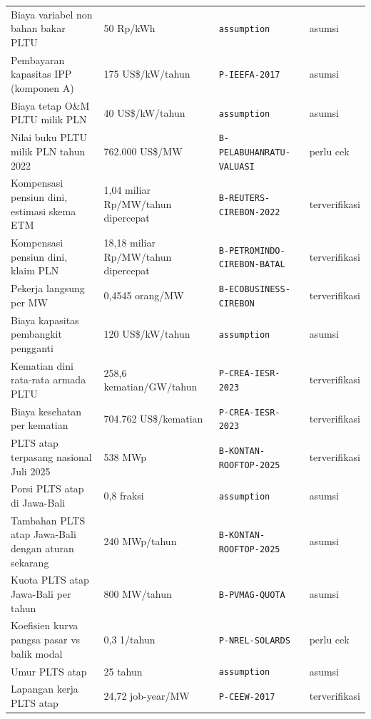 \begin{longtable}{p{} p{} p{} p{}}
Biaya variabel non bahan bakar PLTU & 50 Rp/kWh & \texttt{assumption} & asumsi \\
Pembayaran kapasitas IPP (komponen A) & 175 US\$/kW/tahun & \texttt{P-\allowbreak{}IEEFA-\allowbreak{}2017} & asumsi \\
Biaya tetap O\&M PLTU milik PLN & 40 US\$/kW/tahun & \texttt{assumption} & asumsi \\
Nilai buku PLTU milik PLN tahun 2022 & 762.000 US\$/MW & \texttt{B-\allowbreak{}PELABUHANRATU-\allowbreak{}VALUASI} & perlu cek \\
Kompensasi pensiun dini, estimasi skema ETM & 1,04 miliar Rp/MW/tahun dipercepat & \texttt{B-\allowbreak{}REUTERS-\allowbreak{}CIREBON-\allowbreak{}2022} & terverifikasi \\
Kompensasi pensiun dini, klaim PLN & 18,18 miliar Rp/MW/tahun dipercepat & \texttt{B-\allowbreak{}PETROMINDO-\allowbreak{}CIREBON-\allowbreak{}BATAL} & terverifikasi \\
Pekerja langsung per MW & 0,4545 orang/MW & \texttt{B-\allowbreak{}ECOBUSINESS-\allowbreak{}CIREBON} & terverifikasi \\
Biaya kapasitas pembangkit pengganti & 120 US\$/kW/tahun & \texttt{assumption} & asumsi \\
Kematian dini rata-rata armada PLTU & 258,6 kematian/GW/tahun & \texttt{P-\allowbreak{}CREA-\allowbreak{}IESR-\allowbreak{}2023} & terverifikasi \\
Biaya kesehatan per kematian & 704.762 US\$/kematian & \texttt{P-\allowbreak{}CREA-\allowbreak{}IESR-\allowbreak{}2023} & terverifikasi \\
PLTS atap terpasang nasional Juli 2025 & 538 MWp & \texttt{B-\allowbreak{}KONTAN-\allowbreak{}ROOFTOP-\allowbreak{}2025} & terverifikasi \\
Porsi PLTS atap di Jawa-Bali & 0,8 fraksi & \texttt{assumption} & asumsi \\
Tambahan PLTS atap Jawa-Bali dengan aturan sekarang & 240 MWp/tahun & \texttt{B-\allowbreak{}KONTAN-\allowbreak{}ROOFTOP-\allowbreak{}2025} & asumsi \\
Kuota PLTS atap Jawa-Bali per tahun & 800 MW/tahun & \texttt{B-\allowbreak{}PVMAG-\allowbreak{}QUOTA} & asumsi \\
Koefisien kurva pangsa pasar vs balik modal & 0,3 1/tahun & \texttt{P-\allowbreak{}NREL-\allowbreak{}SOLARDS} & perlu cek \\
Umur PLTS atap & 25 tahun & \texttt{assumption} & asumsi \\
Lapangan kerja PLTS atap & 24,72 job-year/MW & \texttt{P-\allowbreak{}CEEW-\allowbreak{}2017} & terverifikasi \\

\end{longtable}
